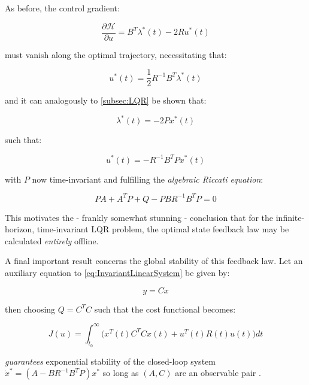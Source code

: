 As before, the control gradient:

\begin{equation}\label{eq:HamiltonianUGradientInfLQR}
	\frac{\partial \mathcal{H}}{\partial u} = B^T\lambda^*(t) - 2Ru^*(t)
\end{equation}

must vanish along the optimal trajectory, necessitating that:

\begin{equation}\label{eq:OptimalControlSequence}
	u^*(t) = \frac{1}{2} R^{-1}B^T\lambda^*(t)
\end{equation}

and it can analogously to \cref{subsec:LQR} be shown that:

\begin{equation}\label{eq:OptimalCostateSequenceInfLQR}
	\lambda^*(t) = -2Px^*(t)
\end{equation}

such that:

\begin{equation}\label{eq:InfLQRFeedbackLaw}
	u^*(t) = -R^{-1}B^TPx^*(t)
\end{equation}

with $P$ now time-invariant and fulfilling the \textit{algebraic Riccati equation}:

\begin{equation}\label{eq:ARE}
	 PA + A^TP + Q - PBR^{-1}B^TP = 0
\end{equation}

This motivates the - frankly somewhat stunning - conclusion that for the infinite-horizon, time-invariant LQR problem, the optimal state feedback law may be calculated \textit{entirely} offline.

A final important result concerns the global stability of this feedback law. Let an auxiliary equation to \cref{eq:InvariantLinearSystem} be given by:

\begin{equation}\label{eq:OutputEquation}
	y = Cx
\end{equation}

then choosing $Q = C^TC$ such that the cost functional becomes:

\begin{equation}\label{eq:ExpoStableLagrangeProblem}
	J(u) = \int_{t_0}^{\infty} \big(x^T(t)C^TCx(t) + u^T(t)R(t)u(t)\big)dt
\end{equation} 

\textit{guarantees} exponential stability of the closed-loop system $\dot{x}^* = (A-BR^{-1}B^TP)x^*$ so long as $(A,C)$ are an observable pair \cite{Liberzon2012}.

